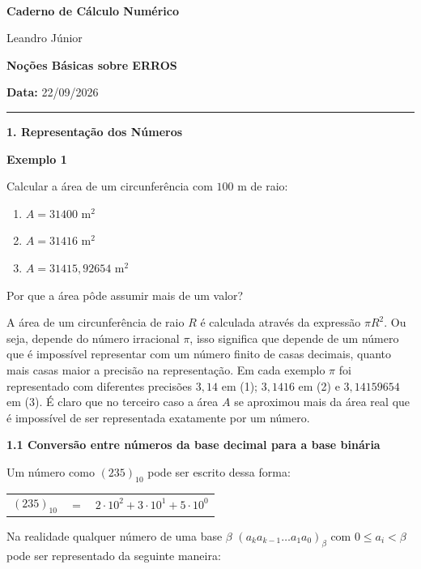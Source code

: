 \documentclass{article}
\begin{document}
	$ $
	\vspace{9cm}
	\begin{center}
		\textbf{\Large{Caderno de Cálculo Numérico}}
	
		Leandro Júnior
	\end{center}
	\newpage
	\textbf{Noções Básicas sobre ERROS}
	
	\textbf{Data:} 22/09/2026
	
	\hrule 
	\vspace{1cm}
		
	\textbf{\large{1. Representação dos Números}}
	\vspace{0.5cm}
	
	\textbf{Exemplo 1}
	
	
	Calcular a área de um circunferência com $100$ m  de raio:
	
	\begin{enumerate}
		\item $A = 31400$ m$^2$
		\item $A = 31416$ m$^2$
		\item $A = 31415,92654$ m$^2$
	\end{enumerate}
		
		Por que a área pôde assumir mais de um valor?
		
		A área de um circunferência de raio $R$ é calculada através da expressão $\pi R^2$. Ou seja, depende do número irracional $\pi$, isso significa que depende de um número que é impossível representar com um número finito de casas decimais, quanto mais casas maior a precisão na representação. Em cada exemplo $\pi$ foi representado com diferentes precisões $3,14$ em (1); $3,1416$ em (2) e $3,14159654$ em (3). É claro que no terceiro caso a área $A$ se aproximou mais da área real que é impossível de ser representada exatamente por um número.
		\vspace{1cm}
		
		\textbf{1.1 Conversão entre números da base decimal para a base binária}
		\vspace{0.5cm}
		
		Um número como $(235)_{10}$ pode ser escrito dessa forma:
		\begin{center}
			\begin{tabular}{lll}
				$(235)_{10}$&$=$&$2\cdot 10^2 + 3\cdot 10^1 + 5 \cdot 10^0$
			\end{tabular}
		\end{center}
		
		Na realidade qualquer número de uma base $\beta$ $(a_ka_{k-1}\dots a_1a_0)_\beta$ com $0\leq a_i <\beta$ pode ser representado da seguinte maneira:
		
\end{document}

